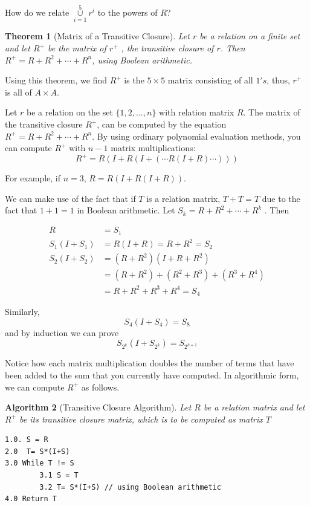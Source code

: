 \documentclass[10pt,]{book}
\theoremstyle{plain}
\newtheorem{theorem}{Theorem}[section]
\newtheorem{algorithm}[theorem]{Algorithm}
\theoremstyle{definition}
\theoremstyle{definition}
\theoremstyle{definition}
\theoremstyle{definition}
\begin{document}
\par
How do we relate \(\underset{i=1}{\overset{5}{\cup }}r^i\) to the powers of \(R\)?%
\begin{theorem}[Matrix of a Transitive Closure]\label{theorem-matrix-transitive-closure}
Let \(r\) be a relation on a finite set and let \(R^+\) be the matrix of \(r^+\) , the transitive closure of \(r\).  Then \(R^+
= R + R^2 + \cdots + R^n\), using Boolean arithmetic.%
\end{theorem}
\par
Using this theorem, we find \(R^+\) is the \(5\times 5\) matrix consisting of all \(1's\), thus, \(r^+\) is all of \(A \times A\).%
\par
Let \(r\) be a relation on the set \(\{1, 2, \dots , n\}\) with relation matrix \(R\). The matrix of the transitive closure \(R^+\), can be computed by the equation \(R^+ = R + R ^2 + \cdots  + R^n\). By using ordinary polynomial evaluation methods, you can compute \(R^+\) with \(n -1\) matrix multiplications: 
\[R^+ = R(I + R(I +( \cdots  R(I+ R) \cdots )))\]%
\par
For example, if \(n = 3\), \(R = R(I + R(I + R))\).%
\par
We can make use of the fact that if \(T\) is a relation matrix, \(T + T = T\) due to the fact that \(1 + 1 = 1\) in Boolean arithmetic. Let \(S_k = R + R^2 + \cdots  + R^k\) . Then %
\par
\begin{equation*}
\begin{split}
R &= S_1\\
S_1(I+S_1)&=R(I+R)=R+R^2 = S_2 \\
S_2(I+S_2)&=(R+R^2)(I+R+R^2) \\
			&=(R+R^2)+(R^2+R^3)+(R^3+R^4) \\
			&=R+R^2+R^3+R^4 = S_4 
\end{split}
\end{equation*}%
\par
Similarly,
\[S_4(I+S_4)=S_8\]
and by induction we can prove
\[S_{2^k}(I+S_{2^k})=S_{2^{k+1}}\]
%
\par
Notice how each matrix multiplication doubles the number of terms that have been added to the sum that you currently have computed. In algorithmic form, we can compute \(R^+\) as follows.%
\begin{algorithm}[Transitive Closure Algorithm]\label{alg-trans-closure}
 Let \(R\) be a relation matrix and let \(R^+\) be its transitive closure matrix, which is to be computed as matrix \(T\)%
\begin{lstlisting}[style=genericinput]
1.0. S = R
2.0  T= S*(I+S)
3.0 While T != S
		3.1 S = T
		3.2 T= S*(I+S) // using Boolean arithmetic
4.0 Return T
\end{lstlisting}
\end{algorithm}
\end{document}
